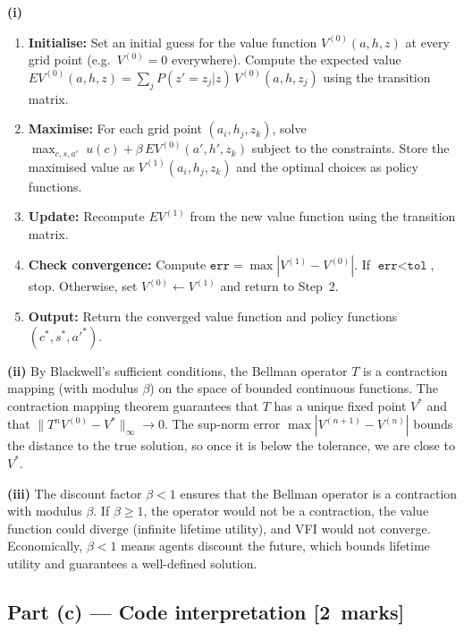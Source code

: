 \documentclass[11pt,a4paper]{article}
\newcommand{\mkpts}[1]{\hfill\textbf{[#1~marks]}}
\begin{document}
\begin{solution}
\textbf{(i)}
\begin{enumerate}[nosep]
\item \textbf{Initialise:} Set an initial guess for the value function $V^{(0)}(a,h,z)$ at every grid point (e.g.\ $V^{(0)} = 0$ everywhere).  Compute the expected value $EV^{(0)}(a,h,z) = \sum_j P(z'=z_j|z)\,V^{(0)}(a,h,z_j)$ using the transition matrix.
\item \textbf{Maximise:} For each grid point $(a_i, h_j, z_k)$, solve $\max_{c,s,a'}\; u(c) + \beta\,EV^{(0)}(a',h',z_k)$ subject to the constraints.  Store the maximised value as $V^{(1)}(a_i,h_j,z_k)$ and the optimal choices as policy functions.
\item \textbf{Update:} Recompute $EV^{(1)}$ from the new value function using the transition matrix.
\item \textbf{Check convergence:} Compute $\texttt{err} = \max|V^{(1)} - V^{(0)}|$.  If $\texttt{err} < \texttt{tol}$, stop.  Otherwise, set $V^{(0)} \leftarrow V^{(1)}$ and return to Step~2.
\item \textbf{Output:} Return the converged value function and policy functions $(c^*, s^*, a'^*)$.
\end{enumerate}

\textbf{(ii)} By Blackwell's sufficient conditions, the Bellman operator $T$ is a contraction mapping (with modulus $\beta$) on the space of bounded continuous functions.  The contraction mapping theorem guarantees that $T$ has a unique fixed point $V^*$ and that $\|T^n V^{(0)} - V^*\|_\infty \to 0$.  The sup-norm error $\max|V^{(n+1)}-V^{(n)}|$ bounds the distance to the true solution, so once it is below the tolerance, we are close to $V^*$.

\medskip

\textbf{(iii)} The discount factor $\beta < 1$ ensures that the Bellman operator is a contraction with modulus $\beta$.  If $\beta \ge 1$, the operator would not be a contraction, the value function could diverge (infinite lifetime utility), and VFI would not converge.  Economically, $\beta < 1$ means agents discount the future, which bounds lifetime utility and guarantees a well-defined solution.
\end{solution}

\subsection*{Part (c) --- Code interpretation \mkpts{2}}
\end{document}
